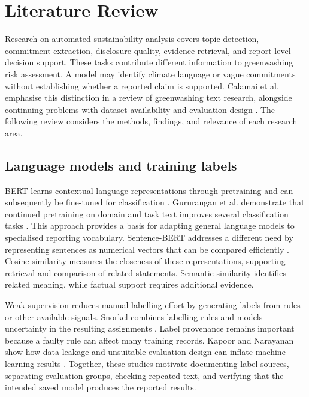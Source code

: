 \section{Literature Review}
\label{sec:literature}

Research on automated sustainability analysis covers topic detection, commitment extraction, disclosure quality, evidence retrieval, and report-level decision support. These tasks contribute different information to greenwashing risk assessment. A model may identify climate language or vague commitments without establishing whether a reported claim is supported. Calamai et al. emphasise this distinction in a review of greenwashing text research, alongside continuing problems with dataset availability and evaluation design \cite{calamai2025}. The following review considers the methods, findings, and relevance of each research area.

\subsection{Language models and training labels}

BERT learns contextual language representations through pretraining and can subsequently be fine-tuned for classification \cite{devlin2019}. Gururangan et al. demonstrate that continued pretraining on domain and task text improves several classification tasks \cite{gururangan2020}. This approach provides a basis for adapting general language models to specialised reporting vocabulary. Sentence-BERT addresses a different need by representing sentences as numerical vectors that can be compared efficiently \cite{reimers2019}. Cosine similarity measures the closeness of these representations, supporting retrieval and comparison of related statements. Semantic similarity identifies related meaning, while factual support requires additional evidence.

Weak supervision reduces manual labelling effort by generating labels from rules or other available signals. Snorkel combines labelling rules and models uncertainty in the resulting assignments \cite{ratner2017}. Label provenance remains important because a faulty rule can affect many training records. Kapoor and Narayanan show how data leakage and unsuitable evaluation design can inflate machine-learning results \cite{kapoor2023}. Together, these studies motivate documenting label sources, separating evaluation groups, checking repeated text, and verifying that the intended saved model produces the reported results.

